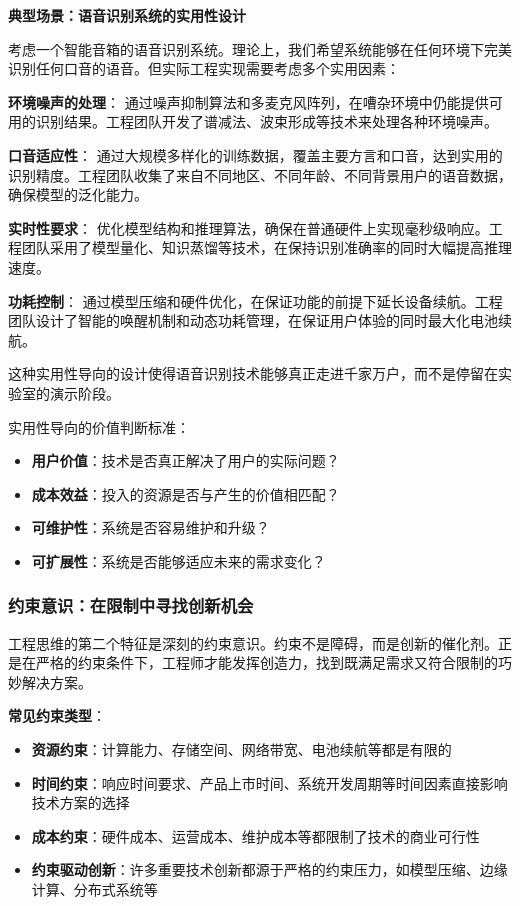 \textbf{典型场景：语音识别系统的实用性设计}

考虑一个智能音箱的语音识别系统。理论上，我们希望系统能够在任何环境下完美识别任何口音的语音。但实际工程实现需要考虑多个实用因素：

\textbf{环境噪声的处理}：
通过噪声抑制算法和多麦克风阵列，在嘈杂环境中仍能提供可用的识别结果。工程团队开发了谱减法、波束形成等技术来处理各种环境噪声。

\textbf{口音适应性}：
通过大规模多样化的训练数据，覆盖主要方言和口音，达到实用的识别精度。工程团队收集了来自不同地区、不同年龄、不同背景用户的语音数据，确保模型的泛化能力。

\textbf{实时性要求}：
优化模型结构和推理算法，确保在普通硬件上实现毫秒级响应。工程团队采用了模型量化、知识蒸馏等技术，在保持识别准确率的同时大幅提高推理速度。

\textbf{功耗控制}：
通过模型压缩和硬件优化，在保证功能的前提下延长设备续航。工程团队设计了智能的唤醒机制和动态功耗管理，在保证用户体验的同时最大化电池续航。

这种实用性导向的设计使得语音识别技术能够真正走进千家万户，而不是停留在实验室的演示阶段。

实用性导向的价值判断标准：
\begin{itemize}
\item \textbf{用户价值}：技术是否真正解决了用户的实际问题？
\item \textbf{成本效益}：投入的资源是否与产生的价值相匹配？
\item \textbf{可维护性}：系统是否容易维护和升级？
\item \textbf{可扩展性}：系统是否能够适应未来的需求变化？
\end{itemize}

\subsubsection{约束意识：在限制中寻找创新机会}

工程思维的第二个特征是深刻的约束意识。约束不是障碍，而是创新的催化剂。正是在严格的约束条件下，工程师才能发挥创造力，找到既满足需求又符合限制的巧妙解决方案。

\textbf{常见约束类型}：
\begin{itemize}
\item \textbf{资源约束}：计算能力、存储空间、网络带宽、电池续航等都是有限的
\item \textbf{时间约束}：响应时间要求、产品上市时间、系统开发周期等时间因素直接影响技术方案的选择
\item \textbf{成本约束}：硬件成本、运营成本、维护成本等都限制了技术的商业可行性
\item \textbf{约束驱动创新}：许多重要技术创新都源于严格的约束压力，如模型压缩、边缘计算、分布式系统等
\end{itemize}

